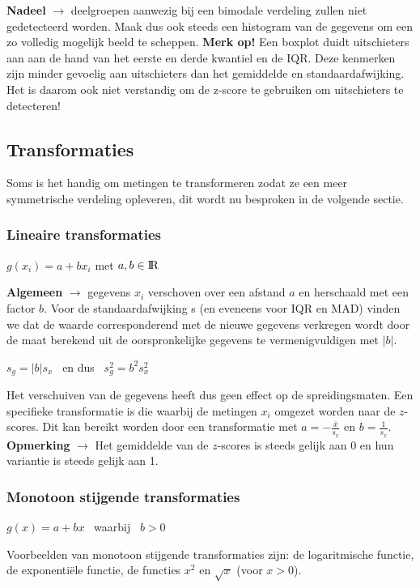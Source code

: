 \documentclass[titlepage]{article}
\numberwithin{equation}{section}
\begin{document}
 \textbf{Nadeel} $\rightarrow$ deelgroepen aanwezig bij een bimodale verdeling zullen niet gedetecteerd worden. Maak dus ook steeds een histogram van de gegevens om een zo volledig mogelijk beeld te scheppen.\newline\newline
 \textbf{Merk op!} Een boxplot duidt uitschieters aan aan de hand van het eerste en derde kwantiel en de IQR. Deze kenmerken zijn minder gevoelig aan uitschieters dan het gemiddelde en standaardafwijking. Het is daarom ook niet verstandig om de z-score te gebruiken om uitschieters te detecteren!
 \subsection{Transformaties}
 Soms is het handig om metingen te transformeren zodat ze een meer symmetrische verdeling opleveren, dit wordt nu besproken in de volgende sectie.
 \subsubsection{Lineaire transformaties}
 \begin{center}
 	$g(x_{i}) = a + bx_{i}$ met $a,b \in {\rm I\!R}$
 \end{center}
 \textbf{Algemeen} $\rightarrow$ gegevens $x_{i}$ verschoven over een afstand $a$ en herschaald met een factor $b$.\newline\newline
 Voor de standaardafwijking s (en eveneens voor IQR en MAD) vinden we dat de waarde corresponderend met de nieuwe gegevens verkregen wordt door de maat berekend uit de oorspronkelijke gegevens te vermenigvuldigen met $|b|$.
 \begin{center}
 	$s_{g} = |b| s_{x}$ \ en dus \ $s_{g}^2 = b^2s_{x}^2$
 \end{center}
 Het verschuiven van de gegevens heeft dus geen effect op de spreidingsmaten.\newline\newline
 Een specifieke transformatie is die waarbij de metingen $x_{i}$ omgezet worden naar de $z$-scores. Dit kan bereikt worden door een transformatie met $a = - \frac{\bar{x}}{s_{x}}$ en $b = \frac{1}{s_{x}}$.\newline\newline
 \textbf{Opmerking} $\rightarrow$ Het gemiddelde van de $z$-scores is steeds gelijk aan 0 en hun variantie is steeds gelijk aan 1.
 \subsubsection{Monotoon stijgende transformaties}
 \begin{center}
 	$g(x) = a + bx$ \ waarbij \ $b>0$
 \end{center}
 Voorbeelden van monotoon stijgende transformaties zijn: de logaritmische functie, de exponentiële functie, de functies $x^2$ en $\sqrt{x}$ (voor $x > 0$).
\end{document}
